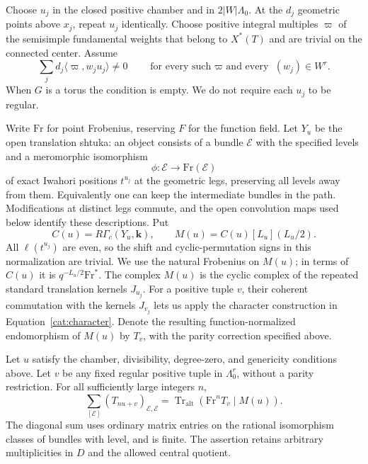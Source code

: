 Choose $u_j$ in the closed positive chamber and in
$2|W|\Lambda_0$.  At the $d_j$ geometric points above $x_j$, repeat
$u_j$ identically.  Choose positive integral multiples $\varpi$ of the
semisimple fundamental weights that belong to $X^*(T)$ and are trivial
on the connected center.  Assume
\begin{equation}\label{rot:genericity}
 \sum_jd_j\langle\varpi,w_ju_j\rangle\ne0
       \qquad\text{for every such $\varpi$ and every }(w_j)\in W^r.
\end{equation}
When $G$ is a torus the condition is empty.  We do not require each
$u_j$ to be regular.

Write $\mathrm{Fr}$ for point Frobenius, reserving $F$ for the function
field.  Let $Y_u$ be the open translation shtuka: an object consists of a
bundle $\mathcal E$ with the specified levels and a meromorphic
isomorphism
\[
 \phi:\mathcal E\longrightarrow\mathrm{Fr}(\mathcal E)
\]
of exact Iwahori positions $t^{u_j}$ at the geometric legs, preserving
all levels away from them.  Equivalently one can keep the intermediate
bundles in the path.  Modifications at distinct legs commute, and the
open convolution maps used below identify these descriptions.  Put
\begin{equation}\label{rot:complex}
 C(u)=R\Gamma_c(Y_u,\mathbf k),\qquad
 M(u)=C(u)[L_u](L_u/2).
\end{equation}
All $\ell(t^{u_j})$ are even, so the shift and cyclic-permutation signs
in this normalization are trivial.  We use the natural Frobenius on
$M(u)$; in terms of $C(u)$ it is $q^{-L_u/2}\mathrm{Fr}^*$.
The complex $M(u)$ is the cyclic complex of the repeated standard
translation kernels $J_{u_j}$.  For a positive tuple $v$, their coherent
commutation with the kernels $J_{v_j}$ lets us apply the character
construction in Equation~\eqref{cat:character}.  Denote the resulting
function-normalized endomorphism of $M(u)$ by $T_v$, with the parity
correction specified above.

\begin{theorem}\label{rot:trace}
Let $u$ satisfy the chamber, divisibility, degree-zero, and genericity
conditions above.  Let $v$ be any fixed regular positive tuple in
$\Lambda_0^r$, without a parity restriction.  For all sufficiently
large integers $n$,
\begin{equation}\label{rot:normalized-trace}
 \sum_{[\mathcal E]}(T_{nu+v})_{\mathcal E,\mathcal E}
   =\operatorname{Tr}_{\mathrm{alt}}
           (\mathrm{Fr}^{n}T_v\mid M(u)).
\end{equation}
The diagonal sum uses ordinary matrix entries on the rational
isomorphism classes of bundles with level, and is finite.  The assertion
retains arbitrary multiplicities in $D$ and the allowed central quotient.
\end{theorem}

